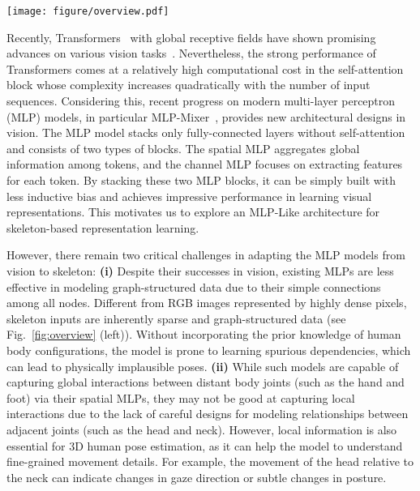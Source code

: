 \documentclass[lettersize,journal]{IEEEtran}
\begin{document}
\begin{figure*}[tb]
\centering
\texttt{[image: figure/overview.pdf]}
\caption
{
Overview of the proposed GraphMLP architecture. 
The left illustrates the skeletal structure of the human body. 
The 2D joint inputs detected by a 2D pose estimator are sparse and graph-structured data.  
GraphMLP treats each 2D keypoint as an input token, linearly embeds each of them through the skeleton embedding, feeds the embedded tokens to GraphMLP layers, and finally performs regression on resulting features to predict the 3D pose via the prediction head. 
Each GraphMLP layer contains one spatial graph MLP (SG-MLP) and one channel graph MLP (CG-MLP). 
For easy illustration, we show the architecture using a single image as input. 
}
\label{fig:overview}
\end{figure*}

Recently, Transformers~\cite{transformer} with global receptive fields have shown promising advances on various vision tasks~\cite{vit,yuan2021temporal,liu2021swinnet,yang2021transformer}. 
Nevertheless, the strong performance of Transformers comes at a relatively high computational cost in the self-attention block whose complexity increases quadratically with the number of input sequences. 
Considering this, recent progress on modern multi-layer perceptron (MLP) models, in particular MLP-Mixer~\cite{mlpmixer}, provides new architectural designs in vision. 
The MLP model stacks only fully-connected layers without self-attention and consists of two types of blocks. 
The spatial MLP aggregates global information among tokens, and the channel MLP focuses on extracting features for each token. 
By stacking these two MLP blocks, it can be simply built with less inductive bias and achieves impressive performance in learning visual representations. 
This motivates us to explore an MLP-Like architecture for skeleton-based representation learning. 

However, there remain two critical challenges in adapting the MLP models from vision to skeleton:
\textbf{(i)} Despite their successes in vision, existing MLPs are less effective in modeling graph-structured data due to their simple connections among all nodes. 
Different from RGB images represented by highly dense pixels, skeleton inputs are inherently sparse and graph-structured data (see Fig.~\ref{fig:overview} (left)). 
Without incorporating the prior knowledge of human body configurations, the model is prone to learning spurious dependencies, which can lead to physically implausible poses. 
\textbf{(ii)} 
While such models are capable of capturing global interactions between distant body joints (such as the hand and foot) via their spatial MLPs, they may not be good at capturing local interactions due to the lack of careful designs for modeling relationships between adjacent joints (such as the head and neck). 
However, local information is also essential for 3D human pose estimation, as it can help the model to understand fine-grained movement details. 
For example, the movement of the head relative to the neck can indicate changes in gaze direction or subtle changes in posture. 
\end{document}
